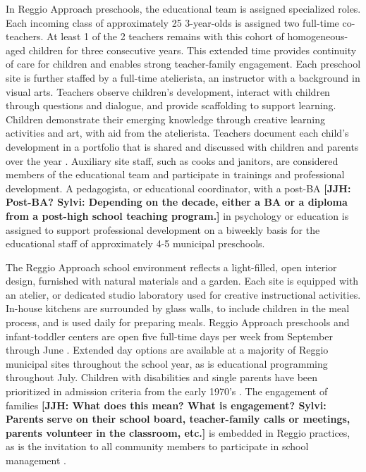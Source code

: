 In Reggio Approach preschools, the educational team is assigned specialized roles. Each incoming class of approximately 25 3-year-olds is assigned two full-time co-teachers. At least 1 of the 2 teachers remains with this cohort of homogeneous-aged children for three consecutive years. This extended time provides continuity of care for children and enables strong teacher-family engagement. Each preschool site is further staffed by a full-time atelierista, an instructor with a background in visual arts. Teachers observe children's development, interact with children through questions and dialogue, and provide scaffolding to support learning. Children demonstrate their emerging knowledge through creative learning activities and art, with aid from the atelierista. Teachers document each child's development in a portfolio that is shared and discussed with children and parents over the year \citep{Rinaldi_2006_ReggioEmilia_BOOK,Giudici-Nicolosi_2014_Reggio-Approach}. Auxiliary site staff, such as cooks and janitors, are considered members of the educational team and participate in trainings and professional development. A pedagogista, or educational coordinator, with a post-BA \textbf{[JJH: Post-BA? Sylvi: Depending on the decade, either a BA or a diploma from a post-high school teaching program.]} in psychology or education is assigned to support professional development on a biweekly basis for the educational staff of approximately 4-5 municipal preschools.

The Reggio Approach school environment reflects a light-filled, open interior design, furnished with natural materials and a garden. Each site is equipped with an atelier, or dedicated studio laboratory used for creative instructional activities. In-house kitchens are surrounded by glass walls, to include children in the meal process, and is used daily for preparing meals. Reggio Approach preschools and infant-toddler centers are open five full-time days per week from September through June \citep{Giudici-Nicolosi_2014_Reggio-Approach}. Extended day options are available at a majority of Reggio municipal sites throughout the school year, as is educational programming throughout July. Children with disabilities and single parents have been prioritized in admission criteria from the early 1970's \citep{Edwards-etal-eds_1998_Hundred-Languages}. The engagement of families \textbf{[JJH: What does this mean? What is engagement? Sylvi: Parents serve on their school board, teacher-family calls or meetings, parents volunteer in the classroom, etc.]} is embedded in Reggio practices, as is the invitation to all community members to participate in school management \citep{CEHD_2016_Historical-Analysis,Cagliari-etal-eds_2016_BOOK_Loris-Malaguzzi}.

